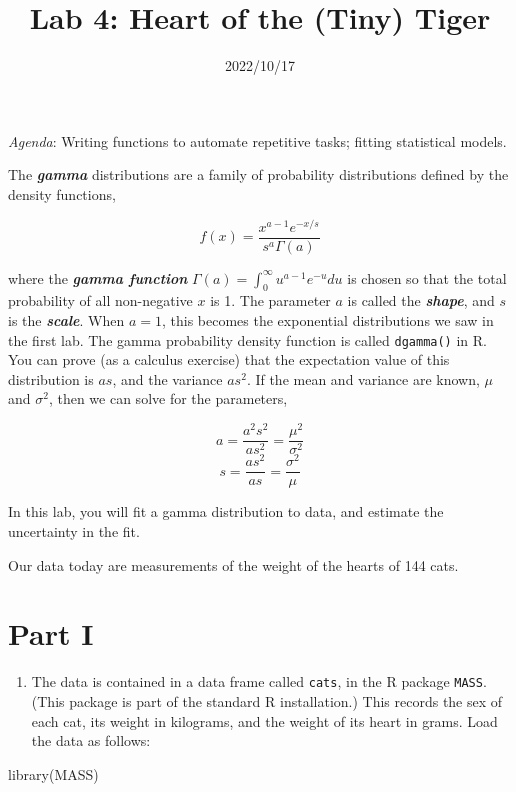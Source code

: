 \documentclass[
]{article}
\title{Lab 4: Heart of the (Tiny) Tiger}
\author{}
\date{\vspace{-2.5em}2022/10/17}
\newenvironment{Shaded}{\begin{snugshade}}{\end{snugshade}}
\newcommand{\FunctionTok}[1]{\textcolor[rgb]{0.00,0.00,0.00}{#1}}
\newcommand{\NormalTok}[1]{#1}
\providecommand{\tightlist}{%
  \setlength{\itemsep}{0pt}\setlength{\parskip}{0pt}}
\begin{document}
\maketitle

\emph{Agenda}: Writing functions to automate repetitive tasks; fitting
statistical models.

The \textbf{\emph{gamma}} distributions are a family of probability
distributions defined by the density functions,

\[ f(x) = \frac{x^{a-1} e^{-x/s}}{s^a \Gamma(a)} \]

where the \textbf{\emph{gamma function}}
\(\Gamma(a) = \int_{0}^{\infty}{u^{a-1} e^{-u} du}\) is chosen so that
the total probability of all non-negative \(x\) is 1. The parameter
\(a\) is called the \textbf{\emph{shape}}, and \(s\) is the
\textbf{\emph{scale}}. When \(a=1\), this becomes the exponential
distributions we saw in the first lab. The gamma probability density
function is called \texttt{dgamma()} in R. You can prove (as a calculus
exercise) that the expectation value of this distribution is \(as\), and
the variance \(as^2\). If the mean and variance are known, \(\mu\) and
\(\sigma^2\), then we can solve for the parameters,

\[ a = \frac{a^2s^2}{as^2} = \frac{\mu^2}{\sigma^2} \]
\[ s = \frac{as^2}{as} = \frac{\sigma^2}{\mu} \]

In this lab, you will fit a gamma distribution to data, and estimate the
uncertainty in the fit.

Our data today are measurements of the weight of the hearts of 144 cats.

\hypertarget{part-i}{%
\section{Part I}\label{part-i}}

\begin{enumerate}
\def\labelenumi{\arabic{enumi}.}
\tightlist
\item
  The data is contained in a data frame called \texttt{cats}, in the R
  package \texttt{MASS}. (This package is part of the standard R
  installation.) This records the sex of each cat, its weight in
  kilograms, and the weight of its heart in grams. Load the data as
  follows:
\end{enumerate}

\begin{Shaded}
\begin{Highlighting}[]
\FunctionTok{library}\NormalTok{(MASS)}
\end{Highlighting}
\end{Shaded}
\end{document}
